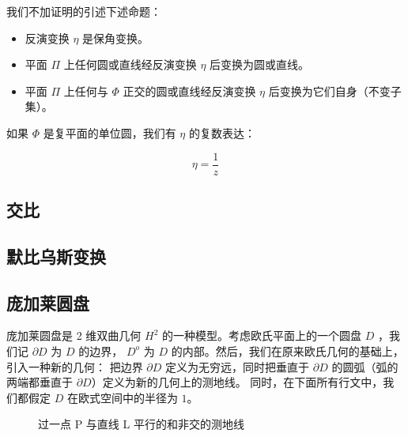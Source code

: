 \documentclass[a4paper,12pt]{article}
\begin{document}
我们不加证明的引述下述命题：

\begin{itemize}
\item 反演变换 $\eta$ 是保角变换。
\item 平面 $\Pi$ 上任何圆或直线经反演变换 $\eta$ 后变换为圆或直线。
\item 平面 $\Pi$ 上任何与 $\Phi$ 正交的圆或直线经反演变换 $\eta$ 后变换为它们自身（不变子集）。
\end{itemize}

如果 $\Phi$ 是复平面的单位圆，我们有 $\eta$ 的复数表达：

$$\eta = \frac{1}{z}$$

\newpage

\subsection{交比}
\newpage

\subsection{默比乌斯变换}
\newpage

\subsection{庞加莱圆盘}

庞加莱圆盘是 2 维双曲几何 $H^2$ 的一种模型。考虑欧氏平面上的一个圆盘 $D$ ，我们记 $\partial D$ 为 $D$ 的边界，
$D^o$ 为 $D$ 的内部。然后，我们在原来欧氏几何的基础上， 引入一种新的几何：
把边界 $\partial D$ 定义为无穷远，同时把垂直于 $\partial D$ 的圆弧（弧的两端都垂直于 $\partial D$）定义为新的几何上的测地线。
同时，在下面所有行文中，我们都假定 $D$ 在欧式空间中的半径为 $1$。

\begin{figure}[ht]
\centering
{}
\caption{过一点 P 与直线 L 平行的和非交的测地线}
\end{figure}
\end{document}
